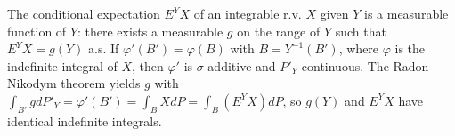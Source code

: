 The conditional expectation $E^Y X$ of an integrable r.v. $X$ given $Y$ is a measurable function of $Y$: there exists a measurable $g$ on the range of $Y$ such that $E^Y X=g(Y)$ a.s. If $\varphi'(B')=\varphi(B)$ with $B=Y^{-1}(B')$, where $\varphi$ is the indefinite integral of $X$, then $\varphi'$ is $\sigma$-additive and $P'_Y$-continuous. The Radon-Nikodym theorem yields $g$ with $\int_{B'}g dP'_Y=\varphi'(B')=\int_B X dP=\int_B(E^Y X)dP$, so $g(Y)$ and $E^Y X$ have identical indefinite integrals.
